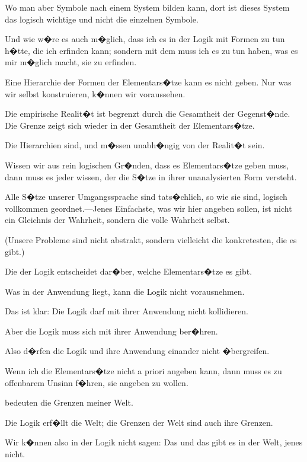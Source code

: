\begin{propositions}
{Wo man aber Symbole nach einem System
bilden kann, dort ist dieses System das logisch
wichtige und nicht die einzelnen Symbole.

Und wie w�re es auch m�glich, dass ich es in
der Logik mit Formen zu tun h�tte, die ich erfinden
kann; sondern mit dem muss ich es zu tun haben,
was es mir m�glich macht, sie zu erfinden.}


{Eine Hierarchie der Formen der Elementars�tze
kann es nicht geben. Nur was wir selbst
konstruieren, k�nnen wir voraussehen.}


{Die empirische Realit�t ist begrenzt durch die
Gesamtheit der Gegenst�nde. Die Grenze zeigt
sich wieder in der Gesamtheit der Elementars�tze.

Die Hierarchien sind, und m�ssen unabh�ngig
von der Realit�t sein.}


{Wissen wir aus rein logischen Gr�nden, dass
es Elementars�tze geben muss, dann muss es jeder
wissen, der die S�tze in ihrer unanalysierten Form
versteht.}


{Alle S�tze unserer Umgangssprache sind tats�chlich,
so wie sie sind, logisch vollkommen geordnet.---Jenes
Einfachste, was wir hier angeben sollen,
ist nicht ein Gleichnis der Wahrheit, sondern die
volle Wahrheit selbst.

(Unsere Probleme sind nicht abstrakt, sondern
vielleicht die konkretesten, die es gibt.)}


{Die  der Logik entscheidet
dar�ber, welche Elementars�tze es gibt.

Was in der Anwendung liegt, kann die Logik
nicht vorausnehmen.

Das ist klar: Die Logik darf mit ihrer Anwendung
nicht kollidieren.

Aber die Logik muss sich mit ihrer Anwendung
ber�hren.

Also d�rfen die Logik und ihre Anwendung
einander nicht �bergreifen.}


{Wenn ich die Elementars�tze nicht a priori
angeben kann, dann muss es zu offenbarem Unsinn
f�hren, sie angeben zu wollen.}


{ bedeuten
die Grenzen meiner Welt.}


{Die Logik erf�llt die Welt; die Grenzen der
Welt sind auch ihre Grenzen.

Wir k�nnen also in der Logik nicht sagen: Das
und das gibt es in der Welt, jenes nicht.

}
\end{propositions}
